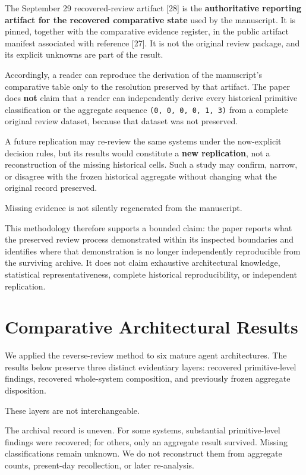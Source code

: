 \documentclass[11pt]{article}
\begin{document}
The September 29 recovered-review artifact [28] is the \textbf{authoritative reporting artifact for the recovered comparative state} used by the manuscript. It is pinned, together with the comparative evidence register, in the public artifact manifest associated with reference [27]. It is not the original review package, and its explicit unknowns are part of the result.

Accordingly, a reader can reproduce the derivation of the manuscript's comparative table only to the resolution preserved by that artifact. The paper does \textbf{not} claim that a reader can independently derive every historical primitive classification or the aggregate sequence \texttt{(0, 0, 0, 0, 1, 3)} from a complete original review dataset, because that dataset was not preserved.

A future replication may re-review the same systems under the now-explicit decision rules, but its results would constitute a \textbf{new replication}, not a reconstruction of the missing historical cells. Such a study may confirm, narrow, or disagree with the frozen historical aggregate without changing what the original record preserved.

Missing evidence is not silently regenerated from the manuscript.

This methodology therefore supports a bounded claim: the paper reports what the preserved review process demonstrated within its inspected boundaries and identifies where that demonstration is no longer independently reproducible from the surviving archive. It does not claim exhaustive architectural knowledge, statistical representativeness, complete historical reproducibility, or independent replication.
\section{Comparative Architectural Results}

We applied the reverse-review method to six mature agent architectures. The results below preserve three distinct evidentiary layers: recovered primitive-level findings, recovered whole-system composition, and previously frozen aggregate disposition.

These layers are not interchangeable.

The archival record is uneven. For some systems, substantial primitive-level findings were recovered; for others, only an aggregate result survived. Missing classifications remain unknown. We do not reconstruct them from aggregate counts, present-day recollection, or later re-analysis.
\end{document}
